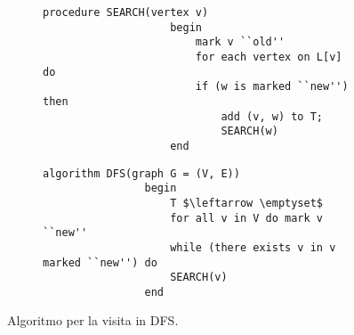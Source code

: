 \documentclass{subfiles}
\begin{document}
\begin{figure}[!h]
    \centering
    \begin{subfigure}[b]{0.5\textwidth}
        \begin{lstlisting}[language = algol]
                procedure SEARCH(vertex v)
                    begin
                        mark v ``old''
                        for each vertex on L[v] do
                        if (w is marked ``new'') then
                            add (v, w) to T;
                            SEARCH(w)
                    end
            \end{lstlisting}
    \end{subfigure}
    \begin{subfigure}[b]{0.65\textwidth}
        \begin{lstlisting}[language = algol]
                algorithm DFS(graph G = (V, E))
                begin
                    T $\leftarrow \emptyset$
                    for all v in V do mark v ``new''
                    while (there exists v in v marked ``new'') do
                    SEARCH(v)
                end
            \end{lstlisting}
    \end{subfigure}
    \caption{Algoritmo per la visita in DFS.}
    \label{Fig:6.2}
\end{figure}
\end{document}
